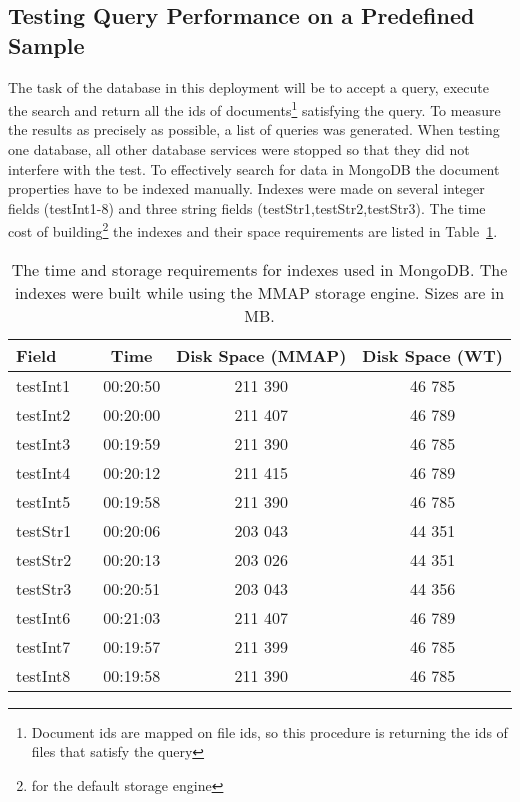 \subsection{Testing Query Performance on a Predefined Sample}

The task of the database in this deployment will be to accept a query, execute the search and return all the 
ids of documents\footnote{Document ids are mapped on file ids, so this procedure is returning the ids of files
that satisfy the query} satisfying the query. To measure the results as precisely as possible, a list of
queries was generated. When testing one database, all other database services were stopped so that they did not
interfere with the test. To effectively search for data in MongoDB the document properties have to be 
indexed manually. Indexes were made on several integer fields (testInt1-8) and three string fields 
(testStr1,testStr2,testStr3). The time cost of building\footnote{for the default storage engine} the 
indexes and their space requirements are listed in Table~\ref{tab:indexBuildTimes}.

\begin{table}[h]
\centering
\begin{tabular}{lcccc}
\toprule
\textbf{Field}   & & \textbf{Time}     & \textbf{Disk Space (MMAP)} & \textbf{Disk Space (WT)} \\ \midrule
testInt1 & & 00:20:50 & 211 390           & 46 785          \\ \hline
testInt2 & & 00:20:00 & 211 407           & 46 789          \\ \hline
testInt3 & & 00:19:59 & 211 390           & 46 785          \\ \hline
testInt4 & & 00:20:12 & 211 415           & 46 789          \\ \hline
testInt5 & & 00:19:58 & 211 390           & 46 785          \\ \hline
testStr1 & & 00:20:06 & 203 043           & 44 351          \\ \hline
testStr2 & & 00:20:13 & 203 026           & 44 351          \\ \hline
testStr3 & & 00:20:51 & 203 043           & 44 356          \\ \hline
testInt6 & & 00:21:03 & 211 407           & 46 789          \\ \hline
testInt7 & & 00:19:57 & 211 399           & 46 785          \\ \hline
testInt8 & & 00:19:58 & 211 390           & 46 785          \\ \toprule
\end{tabular}
\caption{The time and storage requirements for indexes used in MongoDB. The indexes were built while using
the MMAP storage engine. Sizes are in MB.}
\label{tab:indexBuildTimes}
\end{table}

